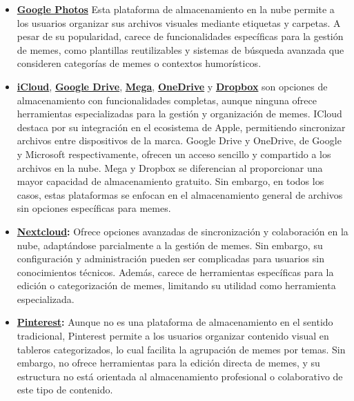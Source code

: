 \begin{itemize}
  \item \textbf{\href{https://www.google.com/intl/es_es/photos/about/}{Google Photos}} Esta plataforma de almacenamiento en la nube permite a los usuarios organizar sus archivos visuales mediante etiquetas y carpetas. A pesar de su popularidad, carece de funcionalidades específicas para la gestión de memes, como plantillas reutilizables y sistemas de búsqueda avanzada que consideren categorías de memes o contextos humorísticos.
  \item \textbf{\href{https://www.icloud.com/}{iCloud}}, \textbf{\href{https://drive.google.com/drive/my-drive?hl=es-419}{Google Drive}}, \textbf{\href{https://mega.io/es}{Mega}}, \textbf{\href{https://www.microsoft.com/es-es/microsoft-365/onedrive/online-cloud-storage}{OneDrive}} y \textbf{\href{https://www.dropbox.com/}{Dropbox}} son opciones de almacenamiento con funcionalidades completas, aunque ninguna ofrece herramientas especializadas para la gestión y organización de memes. ICloud destaca por su integración en el ecosistema de Apple, permitiendo sincronizar archivos entre dispositivos de la marca. Google Drive y OneDrive, de Google y Microsoft respectivamente, ofrecen un acceso sencillo y compartido a los archivos en la nube. Mega y Dropbox se diferencian al proporcionar una mayor capacidad de almacenamiento gratuito. Sin embargo, en todos los casos, estas plataformas se enfocan en el almacenamiento general de archivos sin opciones específicas para memes.
  \item \textbf{\href{https://nextcloud.com/es/}{Nextcloud}:} Ofrece opciones avanzadas de sincronización y colaboración en la nube, adaptándose parcialmente a la gestión de memes. Sin embargo, su configuración y administración pueden ser complicadas para usuarios sin conocimientos técnicos. Además, carece de herramientas específicas para la edición o categorización de memes, limitando su utilidad como herramienta especializada.
  \item \textbf{\href{https://es.pinterest.com/}{Pinterest}:} Aunque no es una plataforma de almacenamiento en el sentido tradicional, Pinterest permite a los usuarios organizar contenido visual en tableros categorizados, lo cual facilita la agrupación de memes por temas. Sin embargo, no ofrece herramientas para la edición directa de memes, y su estructura no está orientada al almacenamiento profesional o colaborativo de este tipo de contenido.
\end{itemize}

